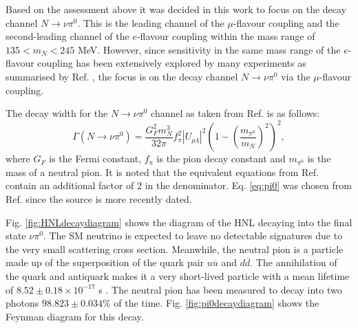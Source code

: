 Based on the assessment above it was decided in this work to focus on the decay channel $N\rightarrow\nu \pi^{0}$.
This is the leading channel of the $\mu$-flavour coupling and the second-leading channel of the $e$-flavour coupling within the mass range of $ 135 < m_{N} < 245 $ MeV.
However, since sensitivity in the same mass range of the $e$-flavour coupling has been extensively explored by many experiments as summarised by Ref. \cite{HNLPresentFuture}, the focus is on the decay channel $N\rightarrow\nu \pi^{0}$ via the $\mu$-flavour coupling.

The decay width for the $N\rightarrow\nu \pi^{0}$ channel as taken from Ref. \cite{HNLZarko} is as follows:
\begin{equation}
	\Gamma(N\rightarrow \nu \pi^{0}) = \frac{G_{F}^{2}m_{N}^{3}}{32\pi}f^{2}_{\pi}|U_{\mu4}|^{2}\left(1-\left(\frac{m_{\pi^{0}}}{m_{N}}\right)^{2}\right)^{2},
\label{eq:pi0}
\end{equation}
where $G_{F}$ is the Fermi constant, $f_{\pi}$ is the pion decay constant and $m_{\pi^{0}}$ is the mass of a neutral pion.
It is noted that the equivalent equations from Ref. \cite{SBNHNL, HNLBin} contain an additional factor of 2 in the denominator.
Eq. \ref{eq:pi0} was chosen from Ref. \cite{HNLZarko} since the source is more recently dated. 

Fig. \ref{fig:HNLdecaydiagram} shows the diagram of the HNL decaying into the final state $\nu\pi^0$.
The SM neutrino is expected to leave no detectable signatures due to the very small scattering cross section.
Meanwhile, the neutral pion is a particle made up of the superposition of the quark pair $u\overline{u}$ and $d\overline{d}$. 
The annihilation of the quark and antiquark makes it a very short-lived particle with a mean lifetime of $8.52\pm0.18 \times 10^{-17}$ s \cite{PDG}.
The neutral pion has been measured to decay into two photons $98.823 \pm 0.034 \%$ of the time. 
Fig. \ref{fig:pi0decaydiagram} shows the Feynman diagram for this decay.



